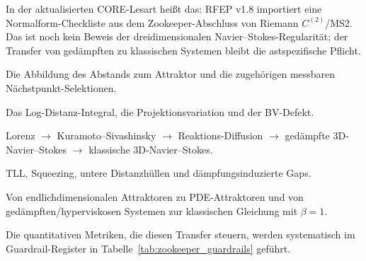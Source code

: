 \documentclass[12pt,a4paper]{article}
\theoremstyle{definition}
\theoremstyle{plain}
\theoremstyle{remark}
\begin{document}
In der aktualisierten CORE-Lesart heißt das: RFEP v1.8 importiert eine
Normalform-Checkliste aus dem Zookeeper-Abschluss von Riemann
$C^{(2)}$/MS2.  Das ist noch kein Beweis der dreidimensionalen
Navier--Stokes-Regularität; der Transfer von gedämpften zu klassischen
Systemen bleibt die astspezifische Pflicht.
\begin{description}[style=nextline,leftmargin=0pt,labelsep=0pt]
  \item[Operator/Form.] Die Abbildung des Abstands zum Attraktor und die
  zugehörigen messbaren Nächstpunkt-Selektionen.
  \item[Defekt.] Das Log-Distanz-Integral, die Projektionsvariation und
  der BV-Defekt.
  \item[Approximation.] Lorenz $\to$ Kuramoto--Sivashinsky $\to$
  Reaktions-Diffusion $\to$ gedämpfte 3D-Navier--Stokes $\to$
  klassische 3D-Navier--Stokes.
  \item[Gap.] TLL, Squeezing, untere Distanzhüllen und dämpfungsinduzierte Gaps.
  \item[Grenzübergang.] Von endlichdimensionalen Attraktoren zu
  PDE-Attraktoren und von gedämpften\slash hyperviskosen Systemen
  zur klassischen Gleichung mit $\beta=1$.
\end{description}

Die quantitativen Metriken, die diesen Transfer steuern, werden systematisch im Guardrail-Register in Tabelle~\ref{tab:zookeeper_guardrails} geführt.
\end{document}
